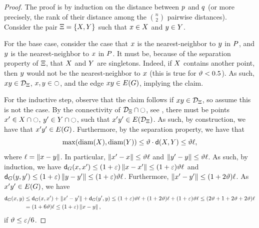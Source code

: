 \documentclass[12pt]{article}%
\begin{document}
\begin{proof}
    The proof is by induction on the distance between $p$ and $q$
    (or more precisely, the rank of their distance among the
    $\binom{n}{2}$ pairwise distances).  Consider the pair
    $\Xi = \{ X, Y \}$ such that $x \in X$ and
    $y \in Y$.

    For the base case, consider the case that $x$ is the
    nearest-neighbor to $y$ in $P$, and $y$ is the
    nearest-neighbor to $x$ in $P$.  It must be, because of the
    separation property of $\Xi$, that $X$ and $Y$ are
    singletons. Indeed, if $X$ contains another point, then $y$
    would not be the nearest-neighbor to $x$ (this is true for
    $\vartheta < 0.5$). As such, $x y \in \mathcal{D}_\Xi$,
    $x, y \in \ocircle$, and the edge $\px \py \in \EGX{\G}$,
    implying the claim.

    For the inductive step, observe that the claim follows if
    $x y \in \mathcal{D}_\Xi$, so assume this is not the case. By the
    connectivity of $\mathcal{D}_\Xi \cap \ocircle$, see
    , there must be points
    $x' \in X \cap \ocircle$, $y' \in Y \cap \ocircle$, such that
    $\px'\py' \in \EGX{ \DT_\Pair}$. As such, by construction, we have
    that $\px'\py' \in \EGX{\G}$. Furthermore, by the separation
    property, we have that
    \begin{equation*}
        \max \pth{ \diameterX{\PSX}, \diameterX{\PSY} }%
        \leq%
        \epsA \cdot \dsY{\PSX}{\PSY}%
        \leq%
        \epsA \ell, 
    \end{equation*}
    where $\ell = \left\| x - y \right\|$. In particular,
    $\left\| x' - x \right\| \leq \vartheta \ell$ and
    $\left\| y' - y \right\| \leq \vartheta \ell$. As such, by induction, we have
    $\dGZ{\G}{\px}{\px'} \leq (1+\eps)\dY{\px}{\px'} \leq
    (1+\eps)\epsA \ell$ and
    $\dGZ{\G}{\py}{\py'} \leq (1+\eps)\dY{\py}{\py'} \leq
    (1+\eps)\epsA \ell$.  Furthermore,
    $\left\| x' - y' \right\| \leq (1+2\vartheta)\ell$. As $\px'\py' \in \EGX{\G}$,
    we have
    \begin{align*}
      \dGZ{\G}{\px}{\py}%
      &\leq%
        \dGZ{\G}{\px}{\px'}%
        +\dY{\px'}{\py'}
        +
        \dGZ{\G}{\py'}{\py}%
        \leq%
        (1+\eps)\epsA \ell
        +(1+2\epsA)\ell
        + (1+\eps)\epsA \ell
        \leq%
        \pth{ 2\epsA +1+2\epsA + 2\epsA } \ell        
      \\&%
      =%
      \pth{ 1+ 6\epsA  } \ell        
      \leq%
      \pth{ 1+ \eps  } \dY{\px}{\py},
    \end{align*}
    if $\vartheta \leq \varepsilon/6$.
\end{proof}
\end{document}
